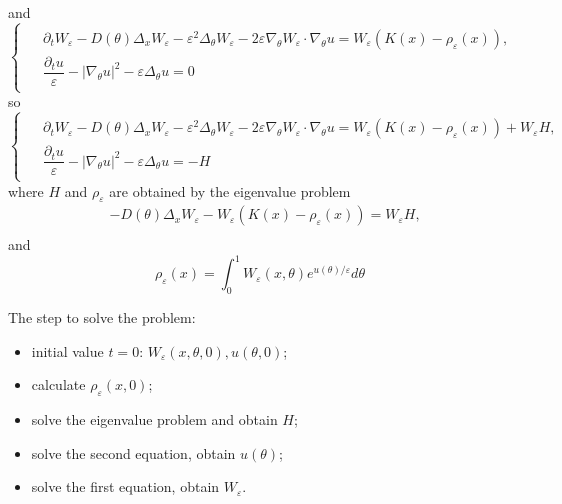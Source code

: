 \documentclass{article}
\begin{document}
and
\begin{equation}
\begin{cases}
\begin{aligned}
&\partial_t W_\varepsilon-D(\theta)\Delta_x W_\varepsilon -\varepsilon^2\Delta_\theta W_\varepsilon - 2\varepsilon\nabla_\theta W_\varepsilon\cdot \nabla_\theta u = W_\varepsilon (K(x)-\rho_\varepsilon(x)),\\
& \dfrac{\partial_t u}{\varepsilon} - |\nabla_\theta u|^2 - \varepsilon \Delta_\theta u=0
\end{aligned}
\end{cases}
\end{equation}
so
\begin{equation}
\begin{cases}
\begin{aligned}
&\partial_t W_\varepsilon-D(\theta)\Delta_x W_\varepsilon -\varepsilon^2\Delta_\theta W_\varepsilon - 2\varepsilon\nabla_\theta W_\varepsilon\cdot \nabla_\theta u = W_\varepsilon (K(x)-\rho_\varepsilon(x)) + W_\varepsilon H,\\
& \dfrac{\partial_t u}{\varepsilon} - |\nabla_\theta u|^2 - \varepsilon \Delta_\theta u= -H
\end{aligned}
\end{cases}
\end{equation}
where $H$ and $\rho_\varepsilon$ are obtained by the eigenvalue problem
\begin{equation}
\begin{aligned}
&-D(\theta)\Delta_x W_\varepsilon - W_\varepsilon (K(x)-\rho_\varepsilon(x)) = W_\varepsilon H,\\
\end{aligned}
\end{equation}
and
\begin{equation}
\rho_\varepsilon(x) = \int_0^1 W_\varepsilon(x,\theta) e^{u(\theta)/\varepsilon} d\theta
\end{equation}

The step to solve the problem:
\begin{itemize}
\item initial value $t=0$: $W_\varepsilon(x,\theta, 0), u(\theta, 0)$;

\item calculate $\rho_\varepsilon(x, 0)$;

\item solve the eigenvalue problem and obtain $H$;

\item solve the second equation, obtain $u(\theta)$;

\item solve the first equation, obtain $W_\varepsilon$.
\end{itemize}
\end{document}

